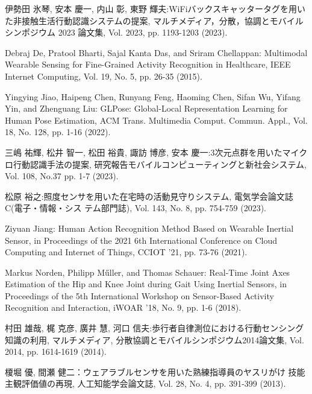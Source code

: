 \begin{thebibliography}{参考文献}
	伊勢田 氷琴, 安本 慶一, 内山 彰, 東野 輝夫:WiFiバックスキャッタータグを用いた非接触生活行動認識システムの提案, マルチメディア，分散，協調とモバイルシンポジウム 2023 論文集, Vol. 2023, pp. 1193-1203 (2023).

	Debraj De, Pratool Bharti, Sajal Kanta Das, and Sriram Chellappan: Multimodal Wearable Sensing for Fine-Grained Activity Recognition in Healthcare, IEEE Internet Computing, Vol. 19, No. 5, pp. 26-35 (2015).

	Yingying Jiao, Haipeng Chen, Runyang Feng, Haoming Chen, Sifan Wu, Yifang Yin, and Zhenguang Liu: GLPose: Global-Local Representation Learning for Human Pose Estimation, ACM Trans. Multimedia Comput. Commun. Appl., Vol. 18, No. 128, pp. 1-16 (2022).

	三嶋 祐輝, 松井 智一, 松田 裕貴, 諏訪 博彦, 安本 慶一:3次元点群を用いたマイクロ行動認識手法の提案, 研究報告モバイルコンピューティングと新社会システム, Vol. 108, No.37 pp. 1-7 (2023).

	松原 裕之:照度センサを用いた在宅時の活動見守りシステム, 電気学会論文誌C(電子・情報・シス テム部門誌), Vol. 143, No. 8, pp. 754-759 (2023).

	Ziyuan Jiang: Human Action Recognition Method Based on Wearable Inertial Sensor, in Proceedings of the 2021 6th International Conference on Cloud Computing and Internet of Things, CCIOT '21, pp. 73-76 (2021).

	Markus Norden, Philipp Műller, and Thomas Schauer: Real-Time Joint Axes Estimation of the Hip and Knee Joint during Gait Using Inertial Sensors, in Proceedings of the 5th International Workshop on Sensor-Based Activity Recognition and Interaction, iWOAR '18, No. 9, pp. 1-6 (2018).

	村田 雄哉, 梶 克彦, 廣井 慧, 河口 信夫:歩行者自律測位における行動センシング知識の利用, マルチメディア, 分散協調とモバイルシンポジウム2014論文集, Vol. 2014, pp. 1614-1619 (2014).
	
	榎堀 優, 間瀬 健二：ウェアラブルセンサを用いた熟練指導員のヤスリがけ
	技能主観評価値の再現, 人工知能学会論文誌, Vol. 28, No. 4, pp. 391-399 (2013).
	

\end{thebibliography}
